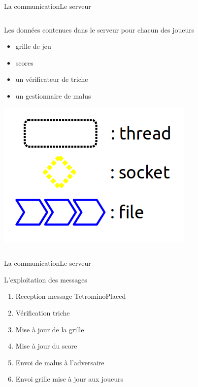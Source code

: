 \documentclass[french]{beamer}
\begin{document}
\begin{frame}{La communication}{Le serveur}
\begin{columns}
			\begin{column}{0.5\textwidth}

				\begin{block}{Les données contenues dans le serveur pour chacun des joueurs}
					\begin{itemize}
						\item grille de jeu
						\item scores
						\item un vérificateur de triche
						\item un gestionnaire de malus
					\end{itemize}
				\end{block}

				\begin{center}
					\includegraphics[scale=0.25]{img/legende.png}
				\end{center}

			\end{column}

		\end{columns}
	\end{frame}




	\begin{frame}{La communication}{Le serveur}
		\begin{block}{L'exploitation des messages}
			\begin{enumerate}
				\item{Reception message TetrominoPlaced}
				\item{Vérification triche}
				\item{Mise à jour de la grille}
				\item{Mise à jour du score}
				\item{Envoi de malus à l'adversaire}
				\item{Envoi grille mise à jour aux joueurs}
			\end{enumerate}
		\end{block}

	\end{frame}
\end{document}
